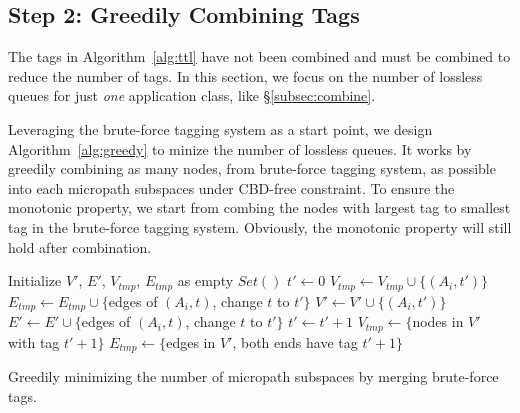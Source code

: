 \subsection{Step 2: Greedily Combining Tags} 

The tags in Algorithm~\ref{alg:ttl} have not been combined and must be combined
to reduce the number of tags. In this section, we focus on the number of lossless 
queues for just {\em one} application class, like \S\ref{subsec:combine}.

Leveraging the brute-force tagging system as a start
point, we design Algorithm~\ref{alg:greedy} to minize the number of lossless
queues. It works by greedily combining as many nodes, from brute-force tagging
system, as possible into each micropath subspaces under CBD-free constraint. To
ensure the monotonic property, we start from combing the nodes with largest tag
to smallest tag in the brute-force tagging system.  Obviously, the monotonic
property will still hold after combination. 

\begin{algorithm}
	\small
	Initialize $V'$, $E'$, $V_{tmp}$, $E_{tmp}$ as empty $Set()$\;
	$t' \gets 0$\;
	 {
		 {
			$V_{tmp} \gets V_{tmp} \cup \{(A_i, t')\}$\;
			$E_{tmp} \gets E_{tmp} \cup \{$edges of $(A_i, t)$, change $t$ to $t'\}$\;
			 {
				$V' \gets V' \cup \{(A_i, t')\}$\;
				$E' \gets E' \cup \{$edges of $(A_i, t)$, change $t$ to $t'\}$\; 
			}
		}
		 {
			$t' \gets t'+1$\;
			$V_{tmp} \gets \{$nodes in $V'$ with tag $t'+1\}$\;
			$E_{tmp} \gets \{$edges in $V'$, both ends have tag $t'+1\}$\;
		}
	}
	\;
    \caption{Greedily minimizing the number of micropath subspaces by merging brute-force tags.}
	\label{alg:greedy}
\end{algorithm}

